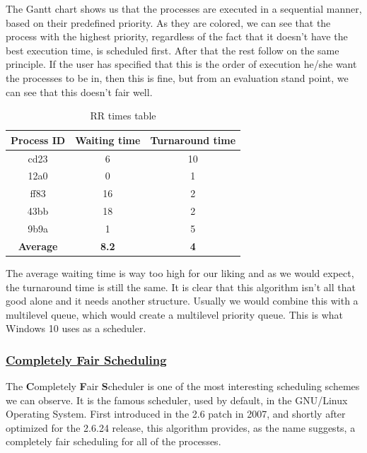 \documentclass{article}
\begin{document}
The Gantt chart shows us that the processes are executed in a sequential manner, based on their predefined priority. As they are colored, we can see that the process with the highest priority, regardless of the fact that it doesn't have the best execution time, is scheduled first. After that the rest follow on the same principle. If the user has specified that this is the order of execution he/she want the processes to be in, then this is fine, but from an evaluation stand point, we can see that this doesn't fair well.

\begin{table}[H]
  \begin{center}
    \label{tab:RR times}
    \begin{tabular}{c|c|c}
      \toprule
      \textbf{Process ID} & \textbf{Waiting time} & \textbf{Turnaround time} \\
      \midrule
      cd23 & 6 & 10 \\
      12a0 & 0 & 1 \\
      ff83 & 16 & 2 \\
      43bb & 18 & 2 \\
      9b9a & 1 & 5 \\
      \bottomrule
      \toprule
      \textbf{Average} & \textbf{8.2} & \textbf{4} \\
    \end{tabular}
    \caption{RR times table}
  \end{center}
\end{table}

The average waiting time is way too high for our liking and as we would expect, the turnaround time is still the same. It is clear that this algorithm isn't all that good alone and it needs another structure. Usually we would combine this with a multilevel queue, which would create a multilevel priority queue. This is what Windows 10 uses as a scheduler.

\subsubsection{\underline{Completely Fair Scheduling}}

The \textbf{C}ompletely \textbf{F}air \textbf{S}cheduler is one of the most interesting scheduling schemes we can observe. It is the famous scheduler, used by default, in the GNU/Linux Operating System. First introduced in the 2.6 patch in 2007, and shortly after optimized for the 2.6.24 release, this algorithm provides, as the name suggests, a completely fair scheduling for all of the processes.
\end{document}
